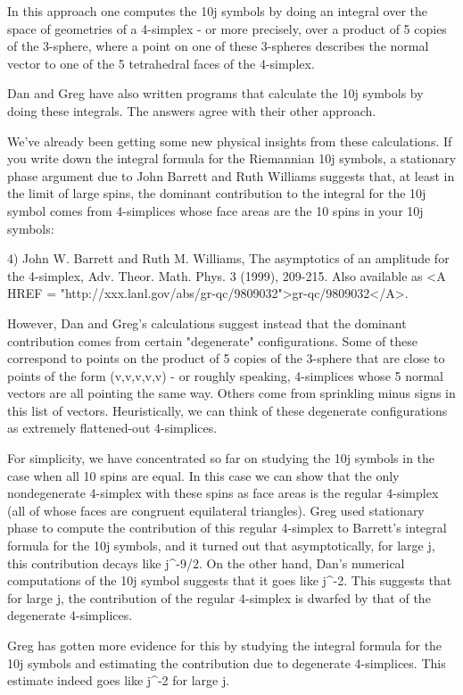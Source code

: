 In this approach one computes the 10j symbols by doing an integral over the 
space of geometries of a 4-simplex - or more precisely, over a product of 
5 copies of the 3-sphere, where a point on one of these 3-spheres describes 
the normal vector to one of the 5 tetrahedral faces of the 4-simplex.  

Dan and Greg have also written programs that calculate the 10j symbols by 
doing these integrals.  The answers agree with their other approach. 

We've already been getting some new physical insights from these 
calculations.  If you write down the integral formula for the Riemannian 
10j symbols, a stationary phase argument due to John Barrett and Ruth 
Williams suggests that, at least in the limit of large spins, the dominant 
contribution to the integral for the 10j symbol comes from 4-simplices whose 
face areas are the 10 spins in your 10j symbols:

4) John W. Barrett and Ruth M. Williams, The asymptotics of an amplitude 
for the 4-simplex, Adv. Theor. Math. Phys. 3 (1999), 209-215.  Also available 
as <A HREF = "http://xxx.lanl.gov/abs/gr-qc/9809032">gr-qc/9809032</A>.

However, Dan and Greg's calculations suggest instead that the dominant 
contribution comes from certain "degenerate" configurations.  Some of 
these correspond to points on the product of 5 copies of the 3-sphere that 
are close to points of the form (v,v,v,v,v) - or roughly speaking, 
4-simplices whose 5 normal vectors are all pointing the same way.  Others 
come from sprinkling minus signs in this list of vectors.  Heuristically,
we can think of these degenerate configurations as extremely flattened-out 
4-simplices.

For simplicity, we have concentrated so far on studying the 10j
symbols in the case when all 10 spins are equal.  In this case we can
show that the only nondegenerate 4-simplex with these spins as face
areas is the regular 4-simplex (all of whose faces are congruent
equilateral triangles).  Greg used stationary phase to compute the
contribution of this regular 4-simplex to Barrett's integral formula
for the 10j symbols, and it turned out that asymptotically, for large
j, this contribution decays like j^{-9/2}.  On the other hand,
Dan's numerical computations of the 10j symbol suggests that it goes
like j^{-2}.  This suggests that for large j, the contribution
of the regular 4-simplex is dwarfed by that of the degenerate
4-simplices.

Greg has gotten more evidence for this by studying the integral formula for 
the 10j symbols and estimating the contribution due to degenerate 4-simplices.
This estimate indeed goes like j^{-2} for large j.  

